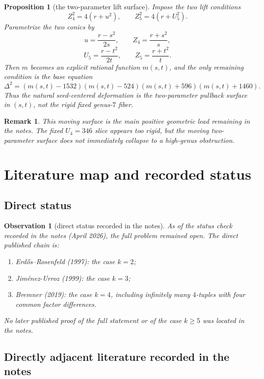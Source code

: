 \documentclass[11pt]{article}
\theoremstyle{plainbreak}
\newtheorem{proposition}[theorem]{Proposition}
\theoremstyle{defbreak}
\newtheorem{observation}[theorem]{Observation}
\newtheorem{remark}[theorem]{Remark}
\begin{document}
\begin{proposition}[the two-parameter lift surface]
Impose the two lift conditions
\[
Z_4^2=4(r+u^2),\qquad Z_5^2=4(r+U_5^2).
\]
Parametrize the two conics by
\[
u=\frac{r-s^2}{2s},\qquad Z_4=\frac{r+s^2}{s},
\]
\[
U_5=\frac{r-t^2}{2t},\qquad Z_5=\frac{r+t^2}{t}.
\]
Then $m$ becomes an explicit rational function $m(s,t)$, and the only remaining condition is the base equation
\[
\Delta^2=(m(s,t)-1532)(m(s,t)-524)(m(s,t)+596)(m(s,t)+1460).
\]
Thus the natural seed-centered deformation is the two-parameter pullback surface in $(s,t)$, not the rigid fixed genus-$7$ fiber.
\end{proposition}

\begin{remark}
This moving surface is the main positive geometric lead remaining in the notes.  The fixed $U_4=346$ slice appears too rigid, but the moving two-parameter surface does not immediately collapse to a high-genus obstruction.
\end{remark}

\section{Literature map and recorded status}

\subsection{Direct status}

\begin{observation}[direct status recorded in the notes]
As of the status check recorded in the notes (April 2026), the full problem remained open.  The direct published chain is:
\begin{enumerate}[label=\textup{(\roman*)}]
    \item Erd\H{o}s--Rosenfeld (1997): the case $k=2$;
    \item Jim\'enez-Urroz (1999): the case $k=3$;
    \item Bremner (2019): the case $k=4$, including infinitely many $4$-tuples with four common factor differences.
\end{enumerate}
No later published proof of the full statement or of the case $k\ge 5$ was located in the notes.
\end{observation}

\subsection{Directly adjacent literature recorded in the notes}
\end{document}
